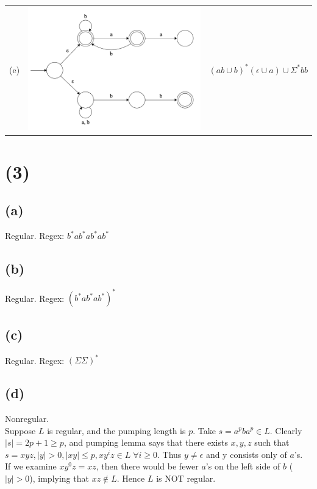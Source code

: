 \documentclass{article}
\begin{document}
\begin{tabular}{m{}|m{}|m{}}
            \hline
            (e) & \includegraphics[width=0.4\paperwidth]{fig/e.png} & $(ab \cup b)^*(\epsilon \cup a) \cup \Sigma^*bb$
        \end{tabular}
    
    \linespread{2.0}

    \section*{(3)}
        \subsection*{(a)}
            Regular. Regex: $b^*ab^*ab^*ab^*$
            
        \subsection*{(b)}
            Regular. Regex: $(b^*ab^*ab^*)^*$
            
        \subsection*{(c)}
            Regular. Regex: $(\Sigma\Sigma)^*$
            
        \subsection*{(d)}
            Nonregular. \\
            Suppose $L$ is regular, and the pumping length is $p$.
            Take $s = a^pba^p \in L$.
            Clearly $|s| = 2p+1 \geq p$, and pumping lemma says that
            there exists $x, y, z$ such that
            $s = xyz, |y| > 0, |xy| \leq p, xy^iz \in L \; \forall i \geq 0$.
            Thus $y \neq \epsilon$ and y consists only of $a$'s. \\
            If we examine $xy^0z = xz$, then there would be fewer $a$'s on the
            left side of $b$ ($|y| > 0$), implying that $xz \notin L$.
            Hence $L$ is NOT regular.
            
\end{document}
